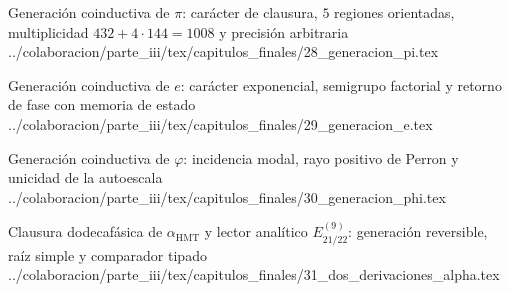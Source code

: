 \HMTSuccessorChapterInput
  {Generación coinductiva de \texorpdfstring{\(\pi\)}{pi}: carácter de clausura, \(5\) regiones orientadas, multiplicidad \texorpdfstring{\(432+4\cdot144=1008\)}{432+4x144=1008} y precisión arbitraria}
  {../colaboracion/parte_iii/tex/capitulos_finales/28_generacion_pi.tex}

\HMTSuccessorChapterInput
  {Generación coinductiva de \texorpdfstring{\(e\)}{e}: carácter exponencial, semigrupo factorial y retorno de fase con memoria de estado}
  {../colaboracion/parte_iii/tex/capitulos_finales/29_generacion_e.tex}

\HMTSuccessorChapterInput
  {Generación coinductiva de \texorpdfstring{\(\varphi\)}{phi}: incidencia modal, rayo positivo de Perron y unicidad de la autoescala}
  {../colaboracion/parte_iii/tex/capitulos_finales/30_generacion_phi.tex}

\begin{HMTScientificOwnerSubordinated}

\end{HMTScientificOwnerSubordinated}
\begingroup
\let\HMTRecoveredOriginalPart\part
\let\part\section
\begin{HMTScientificOwnerSubordinated}


\end{HMTScientificOwnerSubordinated}
\let\part\HMTRecoveredOriginalPart
\endgroup

\HMTSuccessorChapterInput
  {Clausura dodecafásica de \texorpdfstring{\(\alpha_{\mathrm{HMT}}\)}{alpha HMT} y lector analítico \texorpdfstring{\(E_{21/22}^{(9)}\)}{E21/22 de orden 9}: generación reversible, raíz simple y comparador tipado}
  {../colaboracion/parte_iii/tex/capitulos_finales/31_dos_derivaciones_alpha.tex}


